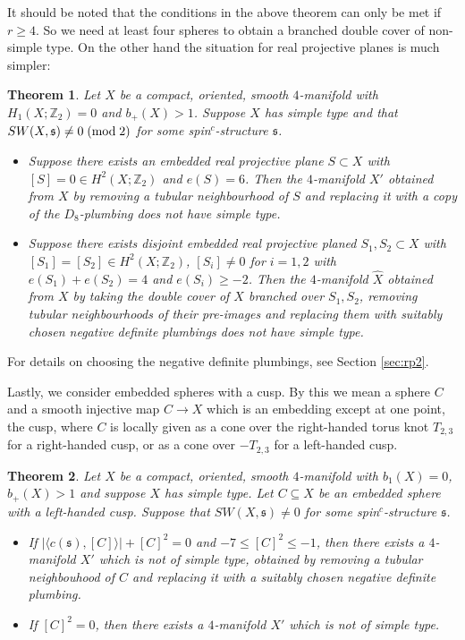 \documentclass{amsart}
\newtheorem{theorem}{Theorem}[section]
\theoremstyle{definition}
\theoremstyle{remark}
\numberwithin{equation}{section}
\begin{document}
It should be noted that the conditions in the above theorem can only be met if $r \ge 4$. So we need at least four spheres to obtain a branched double cover of non-simple type. On the other hand the situation for real projective planes is much simpler:

\begin{theorem}
Let $X$ be a compact, oriented, smooth $4$-manifold with $H_1(X ; \mathbb{Z}_2) = 0$ and $b_+(X) > 1$. Suppose $X$ has simple type and that $SW(X , \mathfrak{s}) \neq 0 \; ({\rm mod} \; 2)$ for some spin$^c$-structure $\mathfrak{s}$. 
\begin{itemize}
\item[(1)]{Suppose there exists an embedded real projective plane $S \subset X$ with $[S] = 0 \in H^2(X ; \mathbb{Z}_2)$ and $e(S) = 6$. Then the $4$-manifold $X'$ obtained from $X$ by removing a tubular neighbourhood of $S$ and replacing it with a copy of the $D_8$-plumbing does not have simple type.}
\item[(2)]{Suppose there exists disjoint embedded real projective planed $S_1,S_2 \subset X$ with $[S_1] = [S_2] \in H^2(X ; \mathbb{Z}_2)$, $[S_i] \neq 0$ for $i=1,2$ with $e(S_1) + e(S_2) = 4$ and $e(S_i) \ge -2$. Then the $4$-manifold $\widehat{X}$ obtained from $X$ by taking the double cover of $X$ branched over $S_1,S_2$, removing tubular neighbourhoods of their pre-images and replacing them with suitably chosen negative definite plumbings does not have simple type.
}
\end{itemize}

\end{theorem}

For details on choosing the negative definite plumbings, see Section \ref{sec:rp2}.

Lastly, we consider embedded spheres with a cusp. By this we mean a sphere $C$ and a smooth injective map $C \to X$ which is an embedding except at one point, the cusp, where $C$ is locally given as a cone over the right-handed torus knot $T_{2,3}$ for a right-handed cusp, or as a cone over $-T_{2,3}$ for a left-handed cusp.



\begin{theorem}
Let $X$ be a compact, oriented, smooth $4$-manifold with $b_1(X) = 0$, $b_+(X) > 1$ and suppose $X$ has simple type. Let $C \subseteq X$ be an embedded sphere with a left-handed cusp. Suppose that $SW(X , \mathfrak{s}) \neq 0$ for some spin$^c$-structure $\mathfrak{s}$.
\begin{itemize}
\item[(1)]{If $| \langle c(\mathfrak{s}) , [C] \rangle | + [C]^2 = 0$ and $-7 \le [C]^2 \le -1$, then there exists a $4$-manifold $X'$ which is not of simple type, obtained by removing a tubular neighbouhood of $C$ and replacing it with a suitably chosen negative definite plumbing.}
\item[(2)]{If $[C]^2 = 0$, then there exists a $4$-manifold $X'$ which is not of simple type.}
\end{itemize}
\end{theorem}
\end{document}
